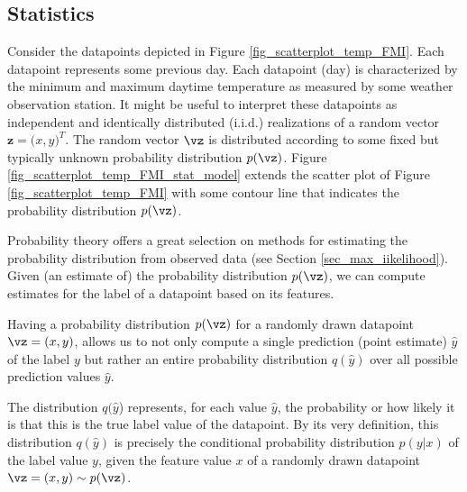 \documentclass[12pt]{report}
\begin{document}
\subsection{Statistics}


Consider the datapoints depicted in Figure \ref{fig_scatterplot_temp_FMI}. 
Each datapoint represents some previous day. Each datapoint (day) 
is characterized by the minimum and maximum daytime temperature 
as measured by some weather observation station. It might 
be useful to interpret these datapoints as independent and 
identically distributed (i.i.d.) realizations of a random vector 
$\mathbf{z} =\big(x,y\big)^{T}$. The random vector $\vz$ 
is distributed according to some fixed but typically unknown 
probability distribution $p(\vz)$. Figure \ref{fig_scatterplot_temp_FMI_stat_model} 
extends the scatter plot of Figure \ref{fig_scatterplot_temp_FMI} 
with some contour line that indicates the probability distribution $p(\vz)$. 

Probability theory offers a great selection on methods for 
estimating the probability distribution from observed data 
(see Section \ref{sec_max_iikelihood}). Given (an estimate of) 
the probability distribution $p(\vz)$, we can compute estimates 
for the label of a datapoint based on its features. 

Having a probability distribution $p(\vz)$ for a randomly 
drawn datapoint $\vz=(x,y)$, allows us to not only compute 
a single prediction (point estimate) $\hat{y}$ of the label $y$ 
but rather an entire probability distribution $q(\hat{y})$ over 
all possible prediction values $\hat{y}$. 

The distribution $q(\hat{y}$) represents, for each value $\hat{y}$, 
the probability or how likely it is that this is the true label value of 
the datapoint. By its very definition, this distribution $q(\hat{y})$ 
is precisely the conditional probability distribution $p(y|x)$ of the 
label value $y$, given the feature value $x$ of a randomly drawn 
datapoint $\vz=(x,y) \sim p(\vz)$. 
\end{document}
